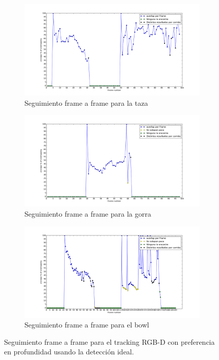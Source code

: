 \begin{figure}
	\centering
	\begin{subfigure}[b]{0.9\textwidth}
		\includegraphics[width=\textwidth]{img/frame_a_frame/rgbd-d-taza.png}
		\caption{Seguimiento frame a frame para la taza}
		\label{frame_frame_rgbd_d_taza}
	\end{subfigure}
	\quad
	\begin{subfigure}[b]{0.9\textwidth}
		\includegraphics[width=\textwidth]{img/frame_a_frame/rgbd-d-gorra.png}
		\caption{Seguimiento frame a frame para la gorra}
		\label{frame_frame_rgbd_d_gorra}
	\end{subfigure}
	\quad
	\begin{subfigure}[b]{0.9\textwidth}
		\includegraphics[width=\textwidth]{img/frame_a_frame/rgbd-d-bowl.png}
		\caption{Seguimiento frame a frame para el bowl}
		\label{frame_frame_rgbd_d_bowl}
	\end{subfigure}
	\caption{Seguimiento frame a frame para el tracking RGB-D con preferencia en profundidad usando la detección ideal.}
	\label{frame_frame_rgbd_d}
\end{figure}

